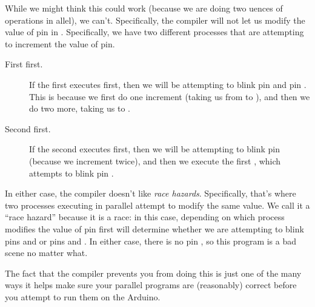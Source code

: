 While we might think this could work (because we are doing two {\SEQ}uences of operations in {\PAR}allel), we can't. Specifically, the \occam compiler will not let us modify the value of {\code pin} in \PARallel. Specifically, we have two different processes that are attempting to increment the value of {\code pin}. 

\begin{description}
	\item[First \SEQ first.] If the first \SEQ executes first, then we will be attempting to blink pin {} and pin {}. This is because we first do one increment (taking us from {} to {}), and then we do two more, taking us to {}.
	\item[Second \SEQ first.] If the second \SEQ executes first, then we will be attempting to blink pin {} (because we increment {} twice), and then we execute the first \SEQ, which attempts to blink pin {}. 
\end{description}

In either case, the compiler doesn't like \emph{race hazards}. Specifically, that's where two processes executing in parallel attempt to modify the same value. We call it a ``race hazard'' because it is a race: in this case, depending on which process modifies the value of {\code pin} first will determine whether we are attempting to blink pins {} and {} or pins {} and {}. In either case, there is no pin {}, so this program is a bad scene no matter what.

The fact that the \occam compiler prevents you from doing this is just one of the many ways it helps make sure your parallel programs are (reasonably) correct before you attempt to run them on the Arduino.

\makingthingsbreak

\XXX

\seealso

\XXX